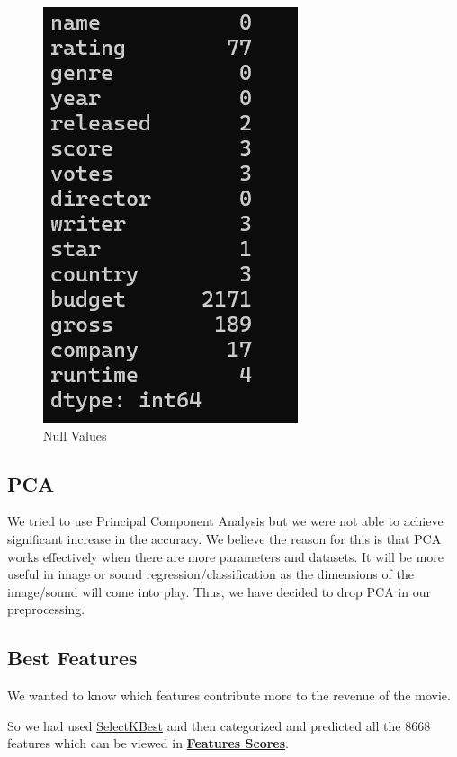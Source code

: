 \documentclass[conference]{IEEEtran}
\begin{document}
            \begin{figure}
                \centering \includegraphics[width=0.4\linewidth]{null-values.png}
                \caption{Null Values}
                \label{fig:null-values}
            \end{figure}
            
        \subsection*{PCA}
            We tried to use Principal Component Analysis but we were not able to achieve significant increase in the accuracy.
            We believe the reason for this is that PCA works effectively when there are more parameters and datasets.
            It will be more useful in image or sound regression/classification as the dimensions of the image/sound will come into play.
            Thus, we have decided to drop PCA in our preprocessing.
            
        \subsection*{Best Features}
            We wanted to know which features contribute more to the revenue of the movie.
            
            So we had used \href{https://scikit-learn.org/stable/modules/generated/sklearn.feature_selection.SelectKBest.html}{SelectKBest} and then categorized and predicted all the 8668 features which can be viewed in \href{https://github.com/Vikranth3140/Movie-Revenue-Prediction/blob/main/Helper%20files/Best%20Festures/feature_scores.txt}{\textbf{Features Scores}}.
            
\end{document}
